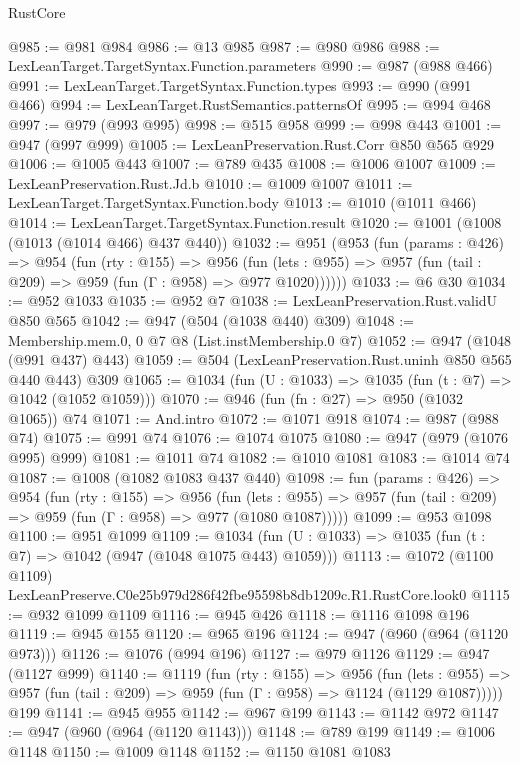 \begin{lexlean}{RustCore}
\begin{coremodule}
@985 := @981 @984
@986 := @13 @985
@987 := @980 @986
@988 := LexLeanTarget.TargetSyntax.Function.parameters
@990 := @987 (@988 @466)
@991 := LexLeanTarget.TargetSyntax.Function.types
@993 := @990 (@991 @466)
@994 := LexLeanTarget.RustSemantics.patternsOf
@995 := @994 @468
@997 := @979 (@993 @995)
@998 := @515 @958
@999 := @998 @443
@1001 := @947 (@997 @999)
@1005 := LexLeanPreservation.Rust.Corr @850 @565 @929
@1006 := @1005 @443
@1007 := @789 @435
@1008 := @1006 @1007
@1009 := LexLeanPreservation.Rust.Jd.b
@1010 := @1009 @1007
@1011 := LexLeanTarget.TargetSyntax.Function.body
@1013 := @1010 (@1011 @466)
@1014 := LexLeanTarget.TargetSyntax.Function.result
@1020 := @1001 (@1008 (@1013 (@1014 @466) @437 @440))
@1032 := @951
    (@953
      (fun (params : @426) =>
      @954
        (fun (rty : @155) =>
        @956
          (fun (lets : @955) => @957 (fun (tail : @209) => @959 (fun (Γ : @958) => @977 @1020))))))
@1033 := @6 @30
@1034 := @952 @1033
@1035 := @952 @7
@1038 := LexLeanPreservation.Rust.validU @850 @565
@1042 := @947 (@504 (@1038 @440) @309)
@1048 := Membership.mem.{0, 0} @7 @8 (List.instMembership.{0} @7)
@1052 := @947 (@1048 (@991 @437) @443)
@1059 := @504 (LexLeanPreservation.Rust.uninh @850 @565 @440 @443) @309
@1065 := @1034 (fun (U : @1033) => @1035 (fun (t : @7) => @1042 (@1052 @1059)))
@1070 := @946 (fun (fn : @27) => @950 (@1032 @1065)) @74
@1071 := And.intro
@1072 := @1071 @918
@1074 := @987 (@988 @74)
@1075 := @991 @74
@1076 := @1074 @1075
@1080 := @947 (@979 (@1076 @995) @999)
@1081 := @1011 @74
@1082 := @1010 @1081
@1083 := @1014 @74
@1087 := @1008 (@1082 @1083 @437 @440)
@1098 := fun (params : @426) =>
  @954
    (fun (rty : @155) =>
    @956
      (fun (lets : @955) =>
      @957 (fun (tail : @209) => @959 (fun (Γ : @958) => @977 (@1080 @1087)))))
@1099 := @953 @1098
@1100 := @951 @1099
@1109 := @1034 (fun (U : @1033) => @1035 (fun (t : @7) => @1042 (@947 (@1048 @1075 @443) @1059)))
@1113 := @1072 (@1100 @1109) LexLeanPreserve.C0e25b979d286f42fbe95598b8db1209c.R1.RustCore.look0
@1115 := @932 @1099 @1109
@1116 := @945 @426
@1118 := @1116 @1098 @196
@1119 := @945 @155
@1120 := @965 @196
@1124 := @947 (@960 (@964 (@1120 @973)))
@1126 := @1076 (@994 @196)
@1127 := @979 @1126
@1129 := @947 (@1127 @999)
@1140 := @1119
    (fun (rty : @155) =>
    @956
      (fun (lets : @955) =>
      @957 (fun (tail : @209) => @959 (fun (Γ : @958) => @1124 (@1129 @1087)))))
    @199
@1141 := @945 @955
@1142 := @967 @199
@1143 := @1142 @972
@1147 := @947 (@960 (@964 (@1120 @1143)))
@1148 := @789 @199
@1149 := @1006 @1148
@1150 := @1009 @1148
@1152 := @1150 @1081 @1083

\end{coremodule}
\end{lexlean}
